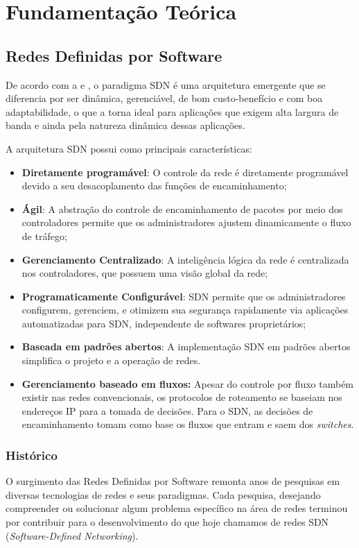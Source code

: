 \chapter{Fundamentação Teórica}

\section{Redes Definidas por Software}

De acordo com a  e , o paradigma SDN é uma arquitetura emergente que se diferencia por ser  dinâmica, gerenciável, de bom custo-benefício e com boa adaptabilidade, o que a torna ideal para aplicações que exigem alta largura de banda e ainda pela natureza dinâmica dessas aplicações.
\par A arquitetura SDN possui como principais características:


\begin{itemize}
    \item \textbf{Diretamente programável}: O controle da rede é diretamente programável devido a seu desacoplamento das funções de encaminhamento;
    \item \textbf{Ágil}: A abstração do controle de encaminhamento de pacotes por meio dos controladores permite que os administradores ajustem dinamicamente o fluxo de tráfego;
    \item \textbf{Gerenciamento Centralizado}: A inteligência lógica da rede é centralizada nos controladores, que possuem uma visão global da rede;
    \item \textbf{Programaticamente Configurável}: SDN permite que os administradores configurem, gerenciem, e otimizem sua segurança rapidamente via aplicações automatizadas para SDN, independente de softwares proprietários;
    \item \textbf{ Baseada em padrões abertos}: A implementação SDN em padrões abertos simplifica o projeto e a operação de redes.
    \item \textbf{Gerenciamento baseado em fluxos:}  Apesar do controle por fluxo também existir nas redes convencionais, os protocolos de roteamento se baseiam nos endereços IP para a tomada de decisões. Para o SDN, as decisões de encaminhamento tomam como base os fluxos que entram e saem dos \emph{switches}.
    
\end{itemize}

\subsection{Histórico}
O surgimento das Redes Definidas por Software remonta anos de pesquisas em diversas tecnologias de redes e seus paradigmas. Cada pesquisa, desejando compreender ou solucionar algum problema específico na área de redes terminou por contribuir para o desenvolvimento do que hoje chamamos de redes SDN (\textit{Software-Defined Networking}).

